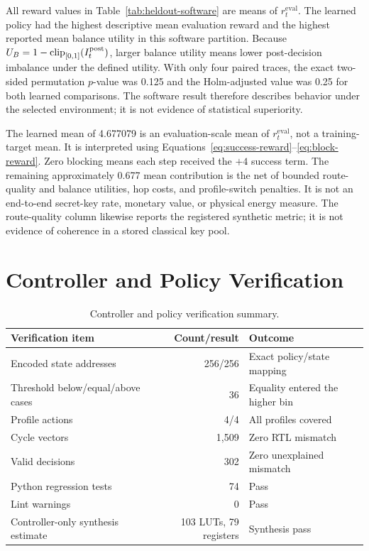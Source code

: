 All reward values in Table~\ref{tab:heldout-software} are means of
$r_t^{\mathrm{eval}}$. The learned policy had the highest descriptive mean
evaluation reward and the highest reported mean balance utility in this software
partition. Because $U_B=1-\operatorname{clip}_{[0,1]}(I_t^{\rm post})$, larger
balance utility means lower post-decision imbalance under the defined utility.
With only four paired traces, the exact two-sided
permutation $p$-value was 0.125 and the Holm-adjusted value was 0.25 for both learned
comparisons. The software result therefore describes behavior under the selected
environment; it is not evidence of statistical superiority.

The learned mean of 4.677079 is an evaluation-scale mean of
$r_t^{\mathrm{eval}}$, not a training-target mean. It is interpreted using
Equations~\eqref{eq:success-reward}--\eqref{eq:block-reward}. Zero blocking means
each step received the $+4$ success term. The remaining approximately 0.677 mean
contribution is the net of bounded route-quality and balance utilities, hop costs,
and profile-switch penalties. It is not an end-to-end secret-key rate, monetary
value, or physical energy measure. The route-quality column likewise reports the
registered synthetic metric; it is not evidence of coherence in a stored classical
key pool.

\section{Controller and Policy Verification}

\begin{table}[H]
\centering
\caption{Controller and policy verification summary.}
\label{tab:controller-verification}
\begin{tabularx}{\textwidth}{@{}X r X@{}}
\toprule
\textbf{Verification item} & \textbf{Count/result} & \textbf{Outcome}\\
\midrule
Encoded state addresses & 256/256 & Exact policy/state mapping\\
Threshold below/equal/above cases & 36 & Equality entered the higher bin\\
Profile actions & 4/4 & All profiles covered\\
Cycle vectors & 1,509 & Zero RTL mismatch\\
Valid decisions & 302 & Zero unexplained mismatch\\
Python regression tests & 74 & Pass\\
Lint warnings & 0 & Pass\\
Controller-only synthesis estimate & 103 LUTs, 79 registers & Synthesis pass\\
\bottomrule
\end{tabularx}
\end{table}

